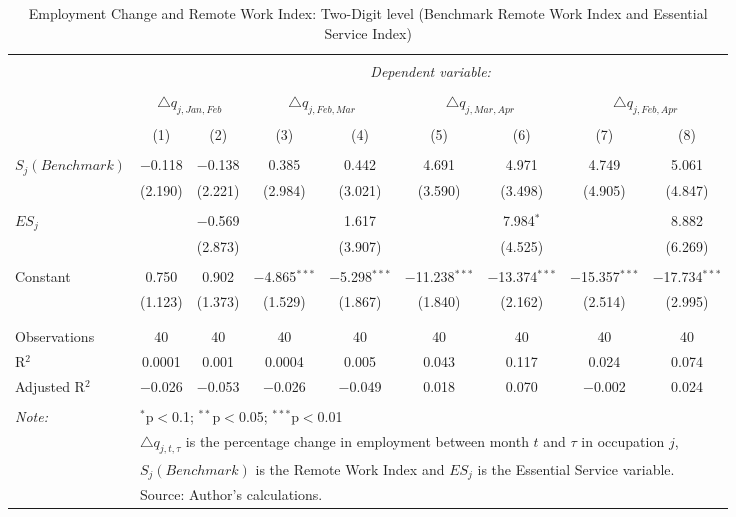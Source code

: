 
\begin{table}[!htbp] \centering 
  \caption{Employment Change and Remote Work Index: Two-Digit level (Benchmark Remote Work Index and Essential Service Index)} 
  \label{tab:regression_dynamics_2digit_robustness_essential_service} 
\footnotesize 
\begin{tabular}{@{\extracolsep{5pt}}lcccccccc} 
\\[-1.8ex]\hline 
\hline \\[-1.8ex] 
 & \multicolumn{8}{c}{\textit{Dependent variable:}} \\ 
\cline{2-9} 
\\[-1.8ex] & \multicolumn{2}{c}{$\triangle q_{j,Jan,Feb}$} & \multicolumn{2}{c}{$\triangle q_{j,Feb,Mar}$} & \multicolumn{2}{c}{$\triangle q_{j,Mar,Apr}$} & \multicolumn{2}{c}{$\triangle q_{j,Feb,Apr}$} \\ 
\\[-1.8ex] & (1) & (2) & (3) & (4) & (5) & (6) & (7) & (8)\\ 
\hline \\[-1.8ex] 
 $S_{j} (Benchmark)$ & $-$0.118 & $-$0.138 & 0.385 & 0.442 & 4.691 & 4.971 & 4.749 & 5.061 \\ 
  & (2.190) & (2.221) & (2.984) & (3.021) & (3.590) & (3.498) & (4.905) & (4.847) \\ 
  & & & & & & & & \\ 
 $ES_{j}$ &  & $-$0.569 &  & 1.617 &  & 7.984$^{*}$ &  & 8.882 \\ 
  &  & (2.873) &  & (3.907) &  & (4.525) &  & (6.269) \\ 
  & & & & & & & & \\ 
 Constant & 0.750 & 0.902 & $-$4.865$^{***}$ & $-$5.298$^{***}$ & $-$11.238$^{***}$ & $-$13.374$^{***}$ & $-$15.357$^{***}$ & $-$17.734$^{***}$ \\ 
  & (1.123) & (1.373) & (1.529) & (1.867) & (1.840) & (2.162) & (2.514) & (2.995) \\ 
  & & & & & & & & \\ 
\hline \\[-1.8ex] 
Observations & 40 & 40 & 40 & 40 & 40 & 40 & 40 & 40 \\ 
R$^{2}$ & 0.0001 & 0.001 & 0.0004 & 0.005 & 0.043 & 0.117 & 0.024 & 0.074 \\ 
Adjusted R$^{2}$ & $-$0.026 & $-$0.053 & $-$0.026 & $-$0.049 & 0.018 & 0.070 & $-$0.002 & 0.024 \\ 
\hline 
\hline \\[-1.8ex] 
\textit{Note:}  & \multicolumn{8}{l}{$^{*}$p$<$0.1; $^{**}$p$<$0.05; $^{***}$p$<$0.01} \\ 
 & \multicolumn{8}{l}{$\triangle q_{j,t,\tau}$ is the percentage change in employment between month $t$ and $\tau$ in occupation $j$,} \\ 
 & \multicolumn{8}{l}{$S_{j} (Benchmark)$ is the Remote Work Index and $ES_{j}$ is the Essential Service variable.} \\ 
 & \multicolumn{8}{l}{Source: Author's calculations.} \\ 
\end{tabular} 
\end{table} 
